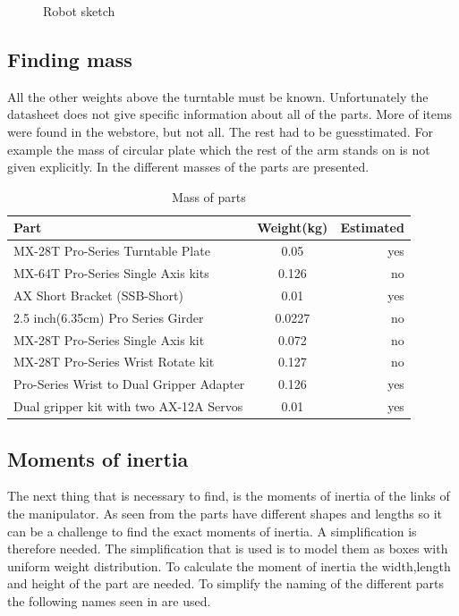 \begin{figure}[htbp]
  \centering
  
  \caption{Robot sketch}
  \label{fig:utgangspunkt}
\end{figure}



\subsection{Finding mass}
All the other weights above the turntable must be known. Unfortunately the datasheet does not give specific information about all of the parts. More of items were found in the webstore, but not all. The rest had to be guesstimated. For example the mass of circular plate which the rest of the arm stands on is not given explicitly. In  the different masses of the parts are presented. 
\begin{table}[htbp]
\centering
\caption{Mass of parts}
\label{table:partmass}
    \begin{tabular}{l c r}
        \toprule
        Part  &  Weight(kg) & Estimated\\
        \midrule
        MX-28T Pro-Series Turntable Plate& 0.05 & yes\\
        MX-64T Pro-Series Single Axis kits& 0.126 & no\\
        AX Short Bracket (SSB-Short) & 0.01 & yes\\
        2.5 inch(6.35cm) Pro Series Girder & 0.0227 & no\\
        MX-28T Pro-Series Single Axis kit & 0.072 & no \\
        MX-28T Pro-Series Wrist Rotate kit & 0.127 & no\\
        Pro-Series Wrist to Dual Gripper Adapter & 0.126 & yes\\
        Dual gripper kit with two AX-12A Servos& 0.01 & yes\\
        \bottomrule
    \end{tabular}
\end{table}


\subsection{Moments of inertia}
The next thing that is necessary to find, is the moments of inertia of the links of the manipulator. As seen from  the parts have different shapes and lengths so it can be a challenge to find the exact moments of inertia. A simplification is therefore needed. The simplification that is used is to model them as boxes with uniform weight distribution. To calculate the moment of inertia the width,length and height of the part are needed. To simplify the naming of the different parts the following names seen in  are used.\\


